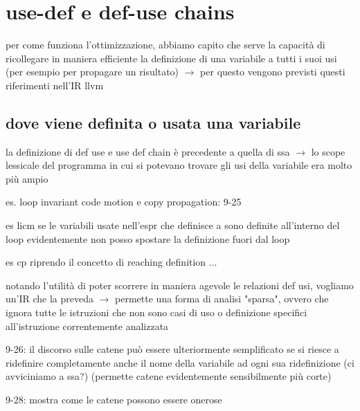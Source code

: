 \section{use-def e def-use chains}

per come funziona l'ottimizzazione, abbiamo capito che serve la capacit\`a di ricollegare in maniera efficiente la definizione di una variabile a tutti i suoi usi (per esempio per propagare un risultato) $\rightarrow$ per questo vengono previsti questi riferimenti nell'IR llvm

\subsection{dove viene definita o usata una variabile}

la definizione di def use e use def chain \`e precedente a quella di ssa $\rightarrow$ lo scope lessicale del programma in cui si potevano trovare gli usi della variabile era molto pi\`u ampio

es. loop invariant code motion e copy propagation: 9-25

es licm se le variabili usate nell'espr che definisce a sono definite all'interno del loop evidentemente non posso spostare la definizione fuori dal loop

es cp riprendo il concetto di reaching definition ...

notando l'utilit\`a di poter scorrere in maniera agevole le relazioni def usi, vogliamo un'IR che la preveda $\rightarrow$ permette una forma di analisi "sparsa", ovvero che ignora tutte le istruzioni che non sono casi di uso o definizione specifici all'istruzione correntemente analizzata

9-26: il discorso sulle catene pu\`o essere ulteriormente semplificato se si riesce a ridefinire completamente anche il nome della variabile ad ogni sua ridefinizione (ci avviciniamo a ssa?) (permette catene evidentemente sensibilmente pi\`u corte)

9-28: mostra come le catene possono essere onerose


